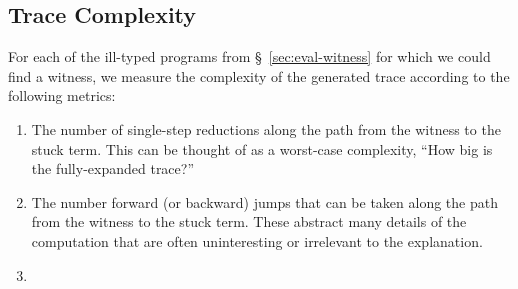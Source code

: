 \subsection{Trace Complexity}
\label{sec:trace-complexity}
For each of the ill-typed programs from \S~\ref{sec:eval-witness} for
which we could find a witness, we measure the complexity of the
generated trace according to the following metrics:
%
\begin{enumerate}
\item The number of single-step reductions along the path from the
  witness to the stuck term. This can be thought of as a worst-case
  complexity, \ie ``How big is the fully-expanded trace?''
\item The number forward (or backward) jumps that can be taken along the
  path from the witness to the stuck term. These abstract many details
  of the computation that are often uninteresting or irrelevant to the
  explanation.
\item {}
\end{enumerate}
%
